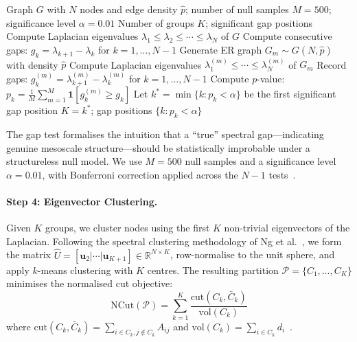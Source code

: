 \begin{algorithm}[H]
\caption{Erd\H{o}s--R\'{e}nyi Spectral Gap Test}
\label{alg:gaptest}
\begin{algorithmic}[1]
\Require Graph $G$ with $N$ nodes and edge density $\hat{p}$; number of null samples $M = 500$; significance level $\alpha = 0.01$
\Ensure Number of groups $K$; significant gap positions
\State Compute Laplacian eigenvalues $\lambda_1 \leq \lambda_2 \leq \cdots \leq \lambda_N$ of $G$
\State Compute consecutive gaps: $g_k = \lambda_{k+1} - \lambda_k$ for $k = 1, \ldots, N-1$
    \State Generate ER graph $G_m \sim G(N, \hat{p})$ with density $\hat{p}$
    \State Compute Laplacian eigenvalues $\lambda_1^{(m)} \leq \cdots \leq \lambda_N^{(m)}$ of $G_m$
    \State Record gaps: $g_k^{(m)} = \lambda_{k+1}^{(m)} - \lambda_k^{(m)}$ for $k = 1, \ldots, N-1$
\EndFor
{}
    \State Compute $p$-value: $p_k = \frac{1}{M}\sum_{m=1}^{M} \mathbf{1}[g_k^{(m)} \geq g_k]$
\EndFor
\State Let $k^* = \min\{k : p_k < \alpha\}$ be the first significant gap position
\State \Return $K = k^*$; gap positions $\{k : p_k < \alpha\}$
\end{algorithmic}
\end{algorithm}

The gap test formalises the intuition that a ``true'' spectral gap---indicating genuine mesoscale structure---should be statistically improbable under a structureless null model. We use $M = 500$ null samples and a significance level $\alpha = 0.01$, with Bonferroni correction applied across the $N-1$ tests~\cite{schmidt2024spectral}.

\paragraph{Step 4: Eigenvector Clustering.}
Given $K$ groups, we cluster nodes using the first $K$ non-trivial eigenvectors of the Laplacian. Following the spectral clustering methodology of Ng et al.~\cite{ng2002spectral}, we form the matrix $\hat{U} = [\mathbf{u}_2 | \cdots | \mathbf{u}_{K+1}] \in \mathbb{R}^{N \times K}$, row-normalise to the unit sphere, and apply $k$-means clustering with $K$ centres. The resulting partition $\mathcal{P} = \{C_1, \ldots, C_K\}$ minimises the normalised cut objective:
\begin{equation}
    \text{NCut}(\mathcal{P}) = \sum_{k=1}^{K} \frac{\text{cut}(C_k, \bar{C}_k)}{\text{vol}(C_k)}
    \label{eq:ncut}
\end{equation}
where $\text{cut}(C_k, \bar{C}_k) = \sum_{i \in C_k, j \notin C_k} A_{ij}$ and $\text{vol}(C_k) = \sum_{i \in C_k} d_i$~\cite{luxburg2007tutorial}.

